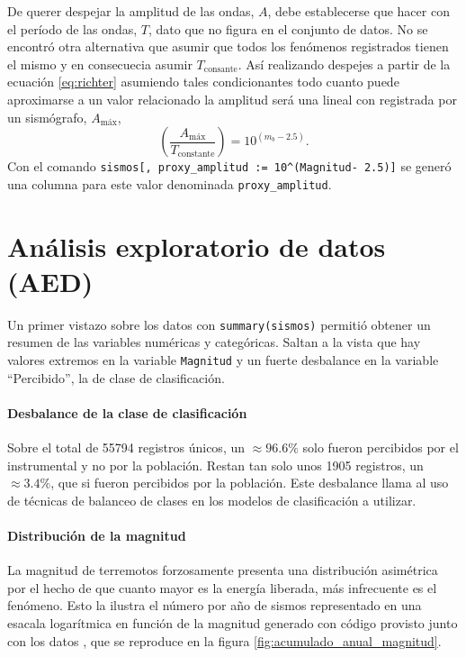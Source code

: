 \documentclass[a4paper]{report}
\begin{document}
De querer despejar la amplitud de las ondas, \(A\), debe establecerse que hacer con el período de las ondas, \(T\), dato que no figura en el conjunto de datos.
No se encontró otra alternativa que asumir que todos los fenómenos registrados tienen el mismo y en consecuecia asumir \(T_\text{consante}\).
Así realizando despejes a partir de la ecuación \ref{eq:richter} asumiendo tales condicionantes todo cuanto puede aproximarse a un valor relacionado la amplitud será una lineal con registrada por un sismógrafo, \(A_\text{máx}\),
\begin{equation}
	\left( \frac{A_\text{máx}}{T_\text{constante}} \right) = 10^{(m_b - 2.5)}.
	\label{eq:linealizacionMagnitud} 
\end{equation}
Con el comando \verb'sismos[, proxy_amplitud := 10^(Magnitud- 2.5)]' se generó una columna para este valor denominada \verb'proxy_amplitud'.


\section{Análisis exploratorio de datos (AED)}\label{sec:AED}

Un primer vistazo sobre los datos con \verb'summary(sismos)' permitió obtener un resumen de las variables numéricas y categóricas.
Saltan a la vista que hay valores extremos en la variable \verb'Magnitud' y un fuerte desbalance en la variable ``Percibido'', la de clase de clasificación.


\paragraph{Desbalance de la clase de clasificación}
Sobre el total de 55794 registros únicos, un \(\approx 96.6\%\) solo fueron percibidos por el instrumental y no por la población.
Restan tan solo unos 1905 registros, un \(\approx 3.4\%\), que si fueron percibidos por la población.
Este desbalance llama al uso de técnicas de balanceo de clases en los modelos de clasificación a utilizar.


\paragraph{Distribución de la magnitud}
La magnitud de terremotos forzosamente presenta una distribución asimétrica por el hecho de que cuanto mayor es la energía liberada, más infrecuente es el fenómeno.
Esto la ilustra el número por año de sismos representado en una esacala logarítmica en función de la magnitud generado con código provisto junto con los datos \cite[sección 4.2.1]{daniela_parada_ic-datasets-docencia_nodate}, que se reproduce en la figura \ref{fig:acumulado_anual_magnitud}.
\end{document}
